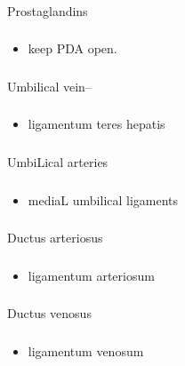 \documentclass[11pt]{beamer}
\begin{document}
\begin{frame}
 \frametitle{}
Prostaglandins
\end{frame}

\begin{frame}
 \frametitle{}
\begin{itemize}
\item{keep PDA open.}
\end{itemize}
\end{frame}

\begin{frame}
 \frametitle{}
Umbilical vein–
\end{frame}

\begin{frame}
 \frametitle{}
\begin{itemize}
\item{ligamentum teres hepatis}
\end{itemize}
\end{frame}

\begin{frame}
 \frametitle{}
UmbiLical arteries
\end{frame}

\begin{frame}
 \frametitle{}
\begin{itemize}
\item{mediaL umbilical ligaments}
\end{itemize}
\end{frame}

\begin{frame}
 \frametitle{}
Ductus arteriosus
\end{frame}

\begin{frame}
 \frametitle{}
\begin{itemize}
\item{ligamentum arteriosum}
\end{itemize}
\end{frame}

\begin{frame}
 \frametitle{}
Ductus venosus
\end{frame}

\begin{frame}
 \frametitle{}
\begin{itemize}
\item{ligamentum venosum}
\end{itemize}
\end{frame}
\end{document}
